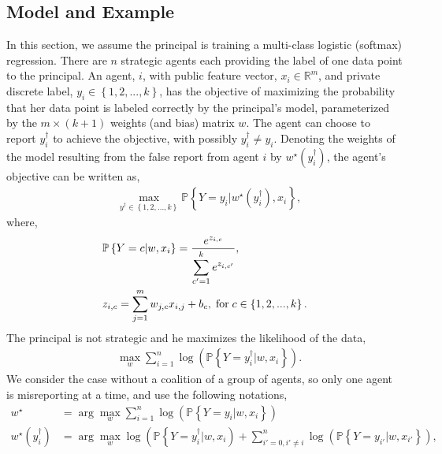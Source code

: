 \documentclass{article}
\begin{document}
\subsection{Model and Example}
In this section, we assume the principal is training a multi-class logistic (softmax) regression. There are $n $ strategic agents each providing the label of one data point to the principal. An agent, $i $, with public feature vector, $x_{i} \in \mathbb{R}^{m}$, and private discrete label, $y_{i} \in \left\{1, 2, ..., k \right\}$, has the objective of maximizing the probability that her data point is labeled correctly by the principal's model, parameterized by the $m  \times \left(k  + 1\right)$ weights (and bias) matrix $w $. The agent can choose to report $y^{\dagger}_{i}$ to achieve the objective, with possibly $y^{\dagger}_{i} \neq  y_{i}$. Denoting the weights of the model resulting from the false report from agent $i $ by $w^\star \left(y^{\dagger}_{i}\right)$, the agent's objective can be written as,
\begin{align*}
&  \displaystyle\max_{y^{\dagger} \in \left\{1, 2, ..., k \right\}} \mathbb{P}\left\{Y = y_{i} | w^\star \left(y^{\dagger}_{i}\right), x_{i}\right\},
\end{align*}
where,
\begin{align*}
&  \mathbb{P}\left\{Y = c | w, x_{i}\right\} = \dfrac{e^{z_{i,c}}}{\displaystyle\sum_{c'=1}^{k} e^{z_{i,c'}}},
\\ &  z_{i,c} = \displaystyle\sum_{j=1}^{m} w_{j,c} x_{i,j} + b_{c} , \text{\;for\;} c \in \left\{1, 2, ..., k\right\}.
\end{align*}
The principal is not strategic and he maximizes the likelihood of the data,
\begin{align*}
&\displaystyle\max_{w} \displaystyle\sum_{i=1}^{n} \log\left(\mathbb{P}\left\{Y = y^{\dagger}_{i} | w, x_{i}\right\}\right).
\end{align*}
We consider the case without a coalition of a group of agents, so only one agent is misreporting at a time, and use the following notations,
\begin{align*}
w^\star  &= \arg\displaystyle\max_{w} \displaystyle\sum_{i=1}^{n} \log\left(\mathbb{P}\left\{Y = y_{i} | w, x_{i}\right\}\right)
\\ w^\star \left(y^{\dagger}_{i}\right) &= \arg\displaystyle\max_{w} \log\left(\mathbb{P}\left\{Y = y^{\dagger}_{i} | w, x_{i}\right) + \displaystyle\sum_{i' = 0, i' \neq  i}^{n} \log\left(\mathbb{P}\left\{Y = y_{i'} | w, x_{i'}\right\}\right),\right.
\end{align*}
\end{document}

